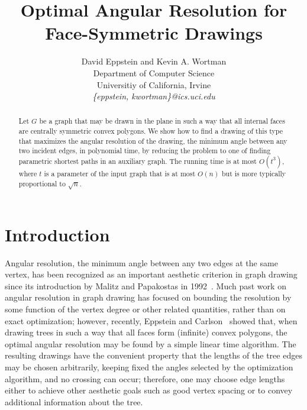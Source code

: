 \documentclass[11pt,letter]{article}
\begin{document}
\lstset{language=Python}

\title{Optimal Angular Resolution for Face-Symmetric Drawings}

\author{David Eppstein and Kevin A. Wortman \\
Department of Computer Science \\
Universitiy of California, Irvine \\
\emph{\{eppstein, kwortman\}@ics.uci.edu}}

\maketitle

\begin{abstract}
Let $G$ be a graph that may be drawn in the plane in such a way that all internal faces are centrally symmetric convex polygons. We show how to find a drawing of this type that maximizes the angular resolution of the drawing, the minimum angle between any two incident edges, in polynomial time, by reducing the problem to one of finding parametric shortest paths in an auxiliary graph.  The running time is at most $O(t^3)$, where $t$ is a parameter of the input graph that is at most $O(n)$ but is more typically proportional to $\sqrt{n}$.
\end{abstract}

\section{Introduction}
Angular resolution, the minimum angle between any two edges at the
same vertex, has been recognized as an important aesthetic criterion
in graph drawing since its introduction by Malitz and Papakostas in
1992~\cite{MalPap-STOC-92}. Much past work on angular resolution in
graph drawing has focused on bounding the resolution by some function
of the vertex degree or other related quantities, rather than on exact optimization; however, recently,
Eppstein and Carlson~\cite{EppCar-GD-06} showed that, when drawing
trees in such a way that all faces form (infinite) convex polygons,
the optimal angular resolution may be found by a simple linear time
algorithm. The resulting drawings have the convenient property that
the lengths of the tree edges may be chosen arbitrarily, keeping fixed
the angles selected by the optimization algorithm, and no crossing can
occur; therefore, one may choose edge lengths either to achieve other
aesthetic goals such as good vertex spacing or to convey additional
information about the tree.
\end{document}
